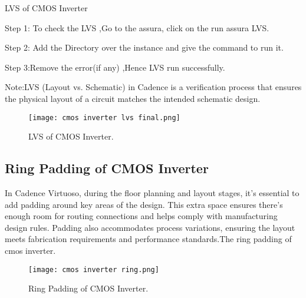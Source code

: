 \documentclass[conference]{IEEEtran}
\begin{document}
\begin{section}{LVS of CMOS Inverter}

Step 1: To check the LVS ,Go to the assura, click on the run assura LVS.

Step 2: Add the Directory over the instance and give the command to run it. 

Step 3:Remove the error(if any) ,Hence LVS run successfully.

Note:LVS (Layout vs. Schematic) in Cadence is a verification process that ensures the physical layout of a circuit matches the intended schematic design.


 \begin{figure}[h] %
    \centering
    \texttt{[image: cmos inverter lvs final.png]} %
    \caption{LVS of CMOS Inverter.} %
     
\end{figure}

















\section{Ring Padding of CMOS Inverter}

In Cadence Virtuoso, during the floor planning and layout stages, it’s essential to add padding around key areas of the design. This extra space ensures there’s enough room for routing connections and helps comply with manufacturing design rules. Padding also accommodates process variations, ensuring the layout meets fabrication requirements and performance standards.The ring padding of cmos inverter. 

\begin{figure}[h] %
    \centering
    \texttt{[image: cmos inverter ring.png]} %
    \caption{Ring Padding of CMOS Inverter.} %
     
\end{figure}
 
\begin{Dynamic Power Analysis} 
 

\end{Dynamic Power Analysis}
\end{section}
\end{document}
